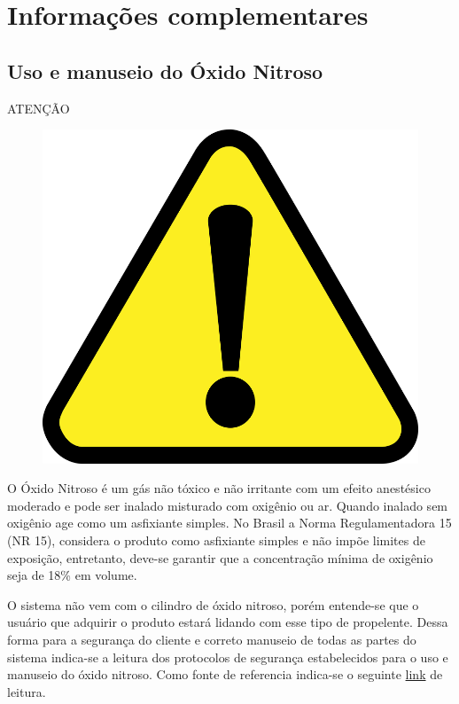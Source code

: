 \chapter{Informações complementares}

\section*{Uso e manuseio do Óxido Nitroso}

\begin{center}
ATENÇÃO
    \begin{figure}[H]
\centering
\includegraphics[scale = 0.1]{Figuras/atenção.png}
\end{figure}
\end{center}

\par O Óxido Nitroso é um gás não tóxico e não irritante com um efeito anestésico moderado e pode ser inalado misturado com oxigênio ou ar. Quando inalado sem oxigênio age como um asfixiante simples. No Brasil a Norma Regulamentadora 15 (NR 15), considera o produto como asfixiante simples e não impõe limites de exposição, entretanto, deve-se garantir que a concentração mínima de oxigênio seja de 18\% em volume. 

\par O sistema não vem com o cilindro de óxido nitroso, porém entende-se que o usuário que adquirir o produto estará lidando com esse tipo de propelente. Dessa forma para a segurança do cliente e correto manuseio de todas as partes do sistema indica-se a leitura dos protocolos de segurança estabelecidos para o uso e manuseio do óxido nitroso. Como fonte de referencia indica-se o seguinte \href{https://www.airliquidehealthcare.com.br/sites/alh_br/files/23003_oxido_nitroso_liquido_refrigerado10024-97-2.pdf}{link} de leitura.

